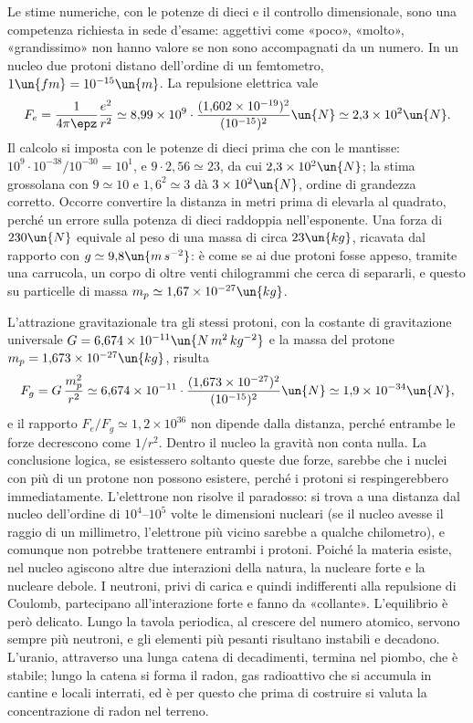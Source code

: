 \documentclass[main.tex]{subfiles}
\begin{document}
Le stime numeriche, con le potenze di dieci e il controllo dimensionale, sono una competenza richiesta in sede d'esame: aggettivi come «poco», «molto», «grandissimo» non hanno valore se non sono accompagnati da un numero. In un nucleo due protoni distano dell'ordine di un femtometro, $1\un{fm}=10^{-15}\un{m}$. La repulsione elettrica vale
\[
F_e=\frac{1}{4\pi\epz}\frac{e^2}{r^2}\simeq 8{,}99\times10^{9}\cdot\frac{(1{,}602\times10^{-19})^2}{(10^{-15})^2}\un{N}\simeq 2{,}3\times10^{2}\un{N}.
\]
Il calcolo si imposta con le potenze di dieci prima che con le mantisse: $10^{9}\cdot10^{-38}/10^{-30}=10^{1}$, e $9\cdot2{,}56\simeq23$, da cui $2{,}3\times10^{2}\un{N}$; la stima grossolana con $9\simeq10$ e $1{,}6^2\simeq3$ dà $3\times10^{2}\un{N}$, ordine di grandezza corretto. Occorre convertire la distanza in metri prima di elevarla al quadrato, perché un errore sulla potenza di dieci raddoppia nell'esponente. Una forza di $230\un{N}$ equivale al peso di una massa di circa $23\un{kg}$, ricavata dal rapporto con $g\simeq9{,}8\un{m\,s^{-2}}$: è come se ai due protoni fosse appeso, tramite una carrucola, un corpo di oltre venti chilogrammi che cerca di separarli, e questo su particelle di massa $m_p\simeq1{,}67\times10^{-27}\un{kg}$.

L'attrazione gravitazionale tra gli stessi protoni, con la costante di gravitazione universale $G=6{,}674\times10^{-11}\un{N\,m^2\,kg^{-2}}$ e la massa del protone $m_p=1{,}673\times10^{-27}\un{kg}$, risulta
\[
F_g=G\,\frac{m_p^2}{r^2}\simeq 6{,}674\times10^{-11}\cdot\frac{(1{,}673\times10^{-27})^2}{(10^{-15})^2}\un{N}\simeq 1{,}9\times10^{-34}\un{N},
\]
e il rapporto $F_e/F_g\simeq1{,}2\times10^{36}$ non dipende dalla distanza, perché entrambe le forze decrescono come $1/r^2$. Dentro il nucleo la gravità non conta nulla. La conclusione logica, se esistessero soltanto queste due forze, sarebbe che i nuclei con più di un protone non possono esistere, perché i protoni si respingerebbero immediatamente. L'elettrone non risolve il paradosso: si trova a una distanza dal nucleo dell'ordine di $10^4$--$10^5$ volte le dimensioni nucleari (se il nucleo avesse il raggio di un millimetro, l'elettrone più vicino sarebbe a qualche chilometro), e comunque non potrebbe trattenere entrambi i protoni. Poiché la materia esiste, nel nucleo agiscono altre due interazioni della natura, la nucleare forte e la nucleare debole. I neutroni, privi di carica e quindi indifferenti alla repulsione di Coulomb, partecipano all'interazione forte e fanno da «collante». L'equilibrio è però delicato. Lungo la tavola periodica, al crescere del numero atomico, servono sempre più neutroni, e gli elementi più pesanti risultano instabili e decadono. L'uranio, attraverso una lunga catena di decadimenti, termina nel piombo, che è stabile; lungo la catena si forma il radon, gas radioattivo che si accumula in cantine e locali interrati, ed è per questo che prima di costruire si valuta la concentrazione di radon nel terreno.
\end{document}

